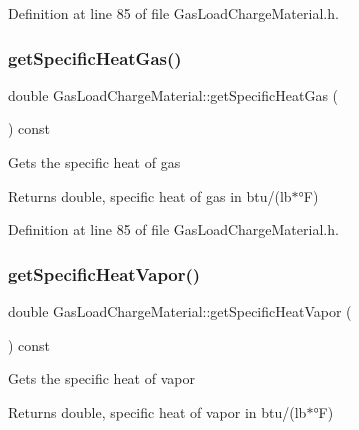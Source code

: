 Definition at line 85 of file Gas\+Load\+Charge\+Material.\+h.

\mbox{\label{class_gas_load_charge_material_a66e956e7a52b1032a3e8a725f26fa580}} 
\subsubsection{\texorpdfstring{get\+Specific\+Heat\+Gas()}{getSpecificHeatGas()}\hspace{0.1cm}{\footnotesize\ttfamily [3/3]}}
{\footnotesize\ttfamily double Gas\+Load\+Charge\+Material\+::get\+Specific\+Heat\+Gas (\begin{DoxyParamCaption}{ }\end{DoxyParamCaption}) const\hspace{0.3cm}{\ttfamily [inline]}}

Gets the specific heat of gas \begin{DoxyReturn}{Returns}
double, specific heat of gas in btu/(lb$\ast$°F) 
\end{DoxyReturn}


Definition at line 85 of file Gas\+Load\+Charge\+Material.\+h.

\mbox{\label{class_gas_load_charge_material_a9a07e86938bb831e51ac3f53f696a3c3}} 
\subsubsection{\texorpdfstring{get\+Specific\+Heat\+Vapor()}{getSpecificHeatVapor()}\hspace{0.1cm}{\footnotesize\ttfamily [1/3]}}
{\footnotesize\ttfamily double Gas\+Load\+Charge\+Material\+::get\+Specific\+Heat\+Vapor (\begin{DoxyParamCaption}{ }\end{DoxyParamCaption}) const\hspace{0.3cm}{\ttfamily [inline]}}

Gets the specific heat of vapor \begin{DoxyReturn}{Returns}
double, specific heat of vapor in btu/(lb$\ast$°F) 
\end{DoxyReturn}


